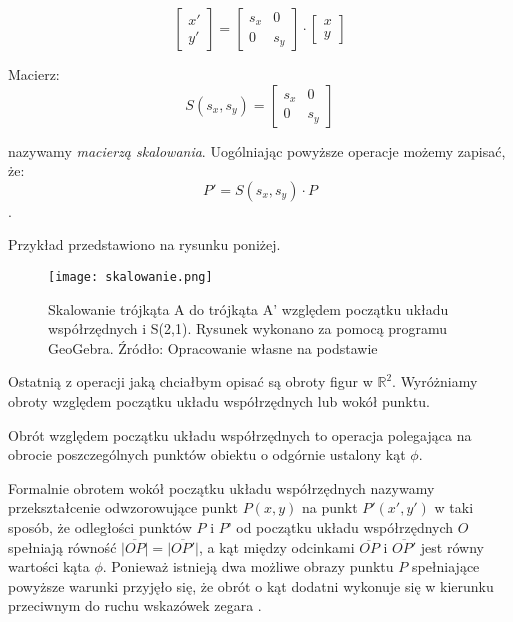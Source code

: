 \begin{equation*}
    \begin{bmatrix}
    x' \\
    y'
    \end{bmatrix}
    =
    \begin{bmatrix}
    s_{x} & 0 \\
    0 & s_{y}
    \end{bmatrix}
    \cdot
    \begin{bmatrix}
    x \\
    y
    \end{bmatrix}
\end{equation*}

Macierz:
\begin{equation*}
S(s_{x}, s_{y}) =
    \begin{bmatrix}
    s_{x} & 0 \\
    0 & s_{y}
    \end{bmatrix}
\end{equation*}

nazywamy \textit{macierzą skalowania}. Uogólniając powyższe operacje możemy zapisać, że:
\begin{equation*}
    P' = S(s_{x}, s_{y}) \cdot P
\end{equation*}
\citep[s. 4-5]{Badura2005}.

Przykład przedstawiono na rysunku poniżej.

\begin{figure}[H]
\texttt{[image: skalowanie.png]}
\caption{Skalowanie trójkąta A do trójkąta A' względem początku układu współrzędnych i S(2,1). Rysunek wykonano za pomocą programu GeoGebra. Źródło: Opracowanie własne na podstawie \citep[s. 4-5]{Badura2005}} 
\centering
\end{figure}

Ostatnią z operacji jaką chciałbym opisać są obroty figur w $\mathbb{R}^{2}$. Wyróżniamy obroty względem początku układu współrzędnych lub wokół punktu.

Obrót względem początku układu współrzędnych to operacja polegająca na obrocie poszczególnych punktów obiektu o odgórnie ustalony kąt $\phi$.

Formalnie obrotem wokół początku układu współrzędnych nazywamy przekształcenie odwzorowujące punkt $P(x,y)$ na punkt $P'(x',y')$ w taki sposób, że odległości punktów $P$ i $P$' od początku układu współrzędnych $O$ spełniają równość $\overline{|OP|} = \overline{|OP'|}$, a kąt między odcinkami $\overline{OP}$ i  $\overline{OP'}$ jest równy wartości kąta $\phi$. Ponieważ istnieją dwa możliwe obrazy punktu $P$ spełniające powyższe warunki przyjęło się, że obrót o kąt dodatni wykonuje się w kierunku przeciwnym do ruchu wskazówek zegara \citep[s. 5 - 6]{Badura2005}.

